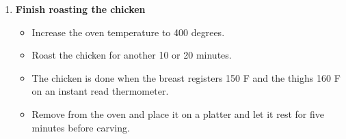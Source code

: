 \documentclass[11pt,letterpaper]{article}
\newcommand \fileName {ChickenWithALemon}
\begin{document}
\begin {description}
\begin{enumerate}
\item{\bf Finish roasting the chicken}
\begin{itemize}
\item Increase the oven temperature to 400 degrees.
\item Roast the chicken for another 10 or 20 minutes.
\item The chicken is done when the breast registers 150 F and the thighs 160 F on an instant read thermometer.
\item Remove from the oven and place it on a platter and let it rest for  five minutes before carving.
\end{itemize}
\end{enumerate}
\end{description}


\end{document}
